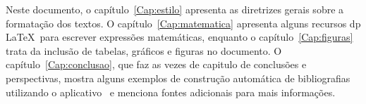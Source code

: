 Neste documento, o capítulo~\ref{Cap:estilo} apresenta as diretrizes
gerais sobre a formatação dos textos. O capítulo~\ref{Cap:matematica}
apresenta alguns recursos dp \LaTeX\ para escrever expressões
matemáticas, enquanto o capítulo~\ref{Cap:figuras} trata da inclusão
de tabelas, gráficos e figuras no documento. O
capítulo~\ref{Cap:conclusao}, que faz as vezes de capitulo de
conclusões e perspectivas, mostra alguns exemplos de construção
automática de bibliografias utilizando o aplicativo \BibTeX\ e
menciona fontes adicionais para mais informações.


